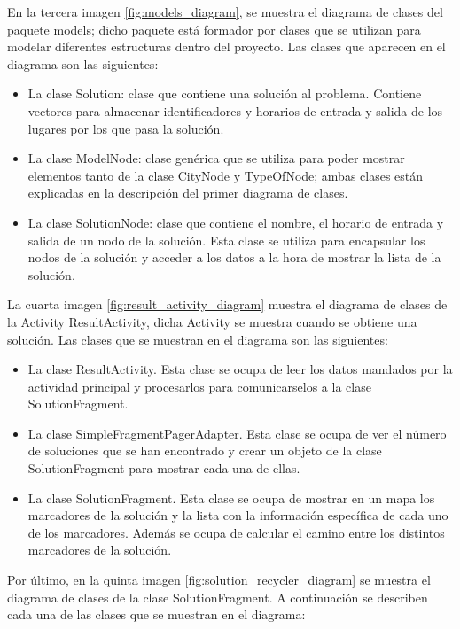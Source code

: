 \vspace{0.06in}
En la tercera imagen \ref{fig:models_diagram}, se muestra el diagrama de clases del paquete models; dicho paquete está formador por clases que se utilizan para modelar diferentes estructuras dentro del proyecto. Las clases que aparecen en el diagrama son las siguientes:
\begin{itemize}
	\item La clase Solution: clase que contiene una solución al problema. Contiene vectores para almacenar identificadores y horarios de entrada y salida de los lugares por los que pasa la solución.
	\item La clase ModelNode: clase genérica que se utiliza para poder mostrar elementos tanto de la clase CityNode y TypeOfNode; ambas clases están explicadas en la descripción del primer diagrama de clases.
	\item La clase SolutionNode: clase que contiene el nombre, el horario de entrada y salida de un nodo de la solución. Esta clase se utiliza para encapsular los nodos de la solución y acceder a los datos a la hora de mostrar la lista de la solución.
\end{itemize}
\vspace{0.06in}
La cuarta imagen \ref{fig:result_activity_diagram} muestra el diagrama de clases de la Activity ResultActivity, dicha Activity se muestra cuando se obtiene una solución. Las clases que se muestran en el diagrama son las siguientes:
\begin{itemize}
	\item La clase ResultActivity. Esta clase se ocupa de leer los datos mandados por la actividad principal y procesarlos para comunicarselos a la clase SolutionFragment.
	\item La clase SimpleFragmentPagerAdapter. Esta clase se ocupa de ver el número de soluciones que se han encontrado y crear un objeto de la clase SolutionFragment para mostrar cada una de ellas.
	\item La clase SolutionFragment. Esta clase se ocupa de mostrar en un mapa los marcadores de la solución y la lista con la información específica de cada uno de los marcadores. Además se ocupa de calcular el camino entre los distintos marcadores de la solución.
\end{itemize}
\vspace{0.06in}
Por último, en la quinta imagen \ref{fig:solution_recycler_diagram} se muestra el diagrama de clases de la clase SolutionFragment. A continuación se describen cada una de las clases que se muestran en el diagrama:
